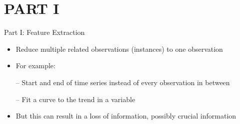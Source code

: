 \documentclass[handout]{beamer}
\begin{document}
\section{PART I}
 
\begin{frame}{Part I: Feature Extraction}
\begin{itemize}
\item Reduce multiple related observations (instances) to one observation
\item For example:
\item[--] Start and end of time series instead of every observation in between
\item[--] Fit a curve to the trend in a variable
\item[]
\item But this can result in a loss of information, possibly crucial information
\end{itemize}
\end{frame}



\end{document}
